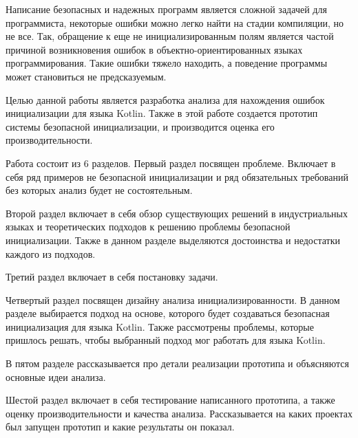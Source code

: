 \intro

Написание безопасных и надежных программ является сложной задачей для программиста,
некоторые ошибки можно легко найти на стадии компиляции, но не все.
Так, обращение к еще не инициализированным полям является частой причиной возникновения ошибок
в объектно-ориентированных языках программирования.
Такие ошибки тяжело находить, а поведение программы может становиться не предсказуемым.

Целью данной работы является разработка анализа для нахождения ошибок инициализации для языка Kotlin.
Также в этой работе создается прототип системы безопасной инициализации, и производится оценка его производительности.

Работа состоит из 6 разделов.
Первый раздел посвящен проблеме.
Включает в себя ряд примеров не безопасной инициализации и ряд обязательных требований без которых анализ будет не состоятельным.

Второй раздел включает в себя обзор существующих решений в индустриальных языках и теоретических подходов
к решению проблемы безопасной инициализации.
Также в данном разделе выделяются достоинства и недостатки каждого из подходов.

Третий раздел включает в себя постановку задачи.

Четвертый раздел посвящен дизайну анализа инициализированности.
В данном разделе выбирается подход на основе, которого будет создаваться безопасная инициализация для языка Kotlin.
Также рассмотрены проблемы, которые пришлось решать, чтобы выбранный подход мог работать для языка Kotlin.

В пятом разделе рассказывается про детали реализации прототипа и объясняются основные идеи анализа.

Шестой раздел включает в себя тестирование написанного прототипа, а также оценку производительности и качества анализа.
Рассказывается на каких проектах был запущен прототип и какие результаты он показал.
